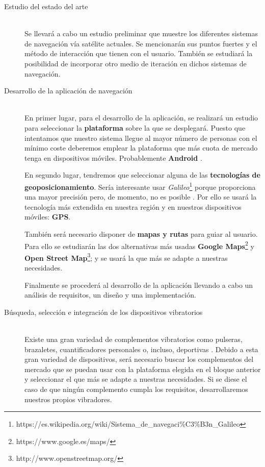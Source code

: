 \documentclass{pre-tfg}
\begin{document}
\begin{description}
\item[Estudio del estado del arte] \hfill \\
  Se llevará a cabo un estudio preliminar que muestre los diferentes sistemas de
  navegación vía satélite actuales. Se mencionarán sus puntos fuertes y el método de
  interacción que tienen con el usuario. También se estudiará la posibilidad de incorporar
  otro medio de iteración en dichos sistemas de navegación.

\item[Desarrollo de la aplicación de navegación] \hfill \\
  En primer lugar, para el desarrollo de la aplicación, se realizará un estudio para
  seleccionar la \textbf{plataforma} sobre la que se desplegará. Puesto que intentamos que
  nuestro sistema llegue al mayor número de personas con el mínimo coste deberemos emplear
  la plataforma que más cuota de mercado tenga en dispositivos móviles. Probablemente
  \textbf{Android} \cite{Mercado}.

  En segundo lugar, tendremos que seleccionar alguna de las \textbf{tecnologías de
    geoposicionamiento}. Sería interesante usar
  \textit{Galileo}\footnote{https://es.wikipedia.org/wiki/Sistema\_de\_navegaci\%C3\%B3n\_Galileo}
  porque proporciona una mayor precisión pero, de momento, no es posible \cite{SPSA} . Por
  ello se usará la tecnología más extendida en nuestra región y en nuestros dispositivos
  móviles: \textbf{GPS}.

  También será necesario disponer de \textbf{mapas y rutas} para guiar al usuario. Para
  ello se estudiarán las dos alternativas más usadas \textbf{Google
    Maps}\footnote{https://www.google.es/maps/} y \textbf{Open Street
    Map}\footnote{http://www.openstreetmap.org/}; y se usará la que más se adapte a
  nuestras necesidades.

  Finalmente se procederá al desarrollo de la aplicación llevando a cabo un análisis de
  requisitos, un diseño y una implementación.

\item[Búsqueda, selección e integración de los dispositivos vibratorios] \hfill \\
  Existe una gran variedad de complementos vibratorios como pulseras, brazaletes,
  cuantificadores personales o, incluso,
  deportivas \cite{Lechal} . Debido
  a esta gran variedad de dispositivos, será necesario buscar los complementos del mercado
  que se puedan usar con la plataforma elegida en el bloque anterior y seleccionar el que
  más se adapte a nuestras necesidades. Si se diese el caso de que ningún complemento
  cumpla los requisitos, desarrollaremos nuestros propios vibradores.


\end{description}
\end{document}
